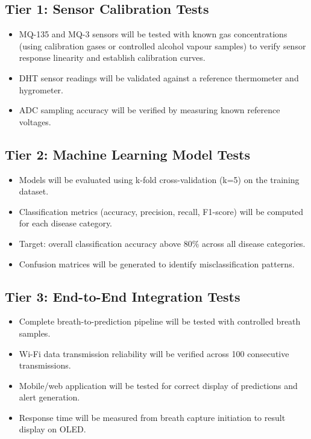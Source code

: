 \subsection{Tier 1: Sensor Calibration Tests}
\begin{itemize}[leftmargin=1.5cm]
\item MQ-135 and MQ-3 sensors will be tested with known gas concentrations (using calibration gases or controlled alcohol vapour samples) to verify sensor response linearity and establish calibration curves.
\item DHT sensor readings will be validated against a reference thermometer and hygrometer.
\item ADC sampling accuracy will be verified by measuring known reference voltages.
\end{itemize}

\subsection{Tier 2: Machine Learning Model Tests}
\begin{itemize}[leftmargin=1.5cm]
\item Models will be evaluated using k-fold cross-validation (k=5) on the training dataset.
\item Classification metrics (accuracy, precision, recall, F1-score) will be computed for each disease category.
\item Target: overall classification accuracy above 80\% across all disease categories.
\item Confusion matrices will be generated to identify misclassification patterns.
\end{itemize}

\subsection{Tier 3: End-to-End Integration Tests}
\begin{itemize}[leftmargin=1.5cm]
\item Complete breath-to-prediction pipeline will be tested with controlled breath samples.
\item Wi-Fi data transmission reliability will be verified across 100 consecutive transmissions.
\item Mobile/web application will be tested for correct display of predictions and alert generation.
\item Response time will be measured from breath capture initiation to result display on OLED.
\end{itemize}
